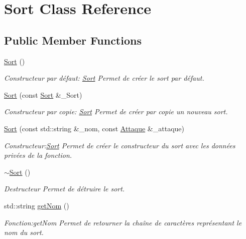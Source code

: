 \hypertarget{classSort}{}\section{Sort Class Reference}
\label{classSort}
\subsection*{Public Member Functions}
\begin{DoxyCompactItemize}
\item 
\hyperlink{classSort_a89ab0e273ec62afb2c1a3b7fc5671503}{Sort} ()
\begin{DoxyCompactList}\small\item\em Constructeur par défaut\+: \hyperlink{classSort}{Sort} Permet de créer le sort par défaut. \end{DoxyCompactList}\item 
\hyperlink{classSort_a0b765452defe7f6f0c6fe4dbec471e7c}{Sort} (const \hyperlink{classSort}{Sort} \&\+\_\+\+Sort)
\begin{DoxyCompactList}\small\item\em Constructeur par copie\+: \hyperlink{classSort}{Sort} Permet de créer par copie un nouveau sort. \end{DoxyCompactList}\item 
\hyperlink{classSort_ac50c836a5f2a6a74665a898d4af24e0a}{Sort} (const std\+::string \&\+\_\+nom, const \hyperlink{classAttaque}{Attaque} \&\+\_\+attaque)
\begin{DoxyCompactList}\small\item\em Constructeur\+:\hyperlink{classSort}{Sort} Permet de créer le constructeur du sort avec les données privées de la fonction. \end{DoxyCompactList}\item 
\mbox{\label{classSort_a8328ac58a93111896221c259baf8b874}} 
\hyperlink{classSort_a8328ac58a93111896221c259baf8b874}{$\sim$\+Sort} ()
\begin{DoxyCompactList}\small\item\em Destructeur Permet de détruire le sort. \end{DoxyCompactList}\item 
std\+::string \hyperlink{classSort_a249f3b41badad1b1fa14b3bf6d3736f3}{get\+Nom} ()
\begin{DoxyCompactList}\small\item\em Fonction\+:get\+Nom Permet de retourner la chaîne de caractères représentant le nom du sort. \end{DoxyCompactList}\item 

\end{DoxyCompactItemize}
